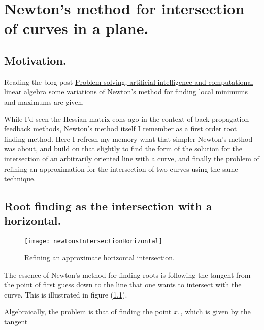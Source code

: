 %
%

\chapter{Newton's method for intersection of curves in a plane.}
\label{chap:intersectionNewton}
{}
\date{Mar 7, 2010}

\beginArtNoToc

\section{Motivation.}

Reading the blog post \href{http://www.cafelinear.com/2010/02/problem-solving-artificial-intelligence-and-linear-algebra/}{Problem solving, artificial intelligence and computational linear algebra} some variations of Newton's method for finding local minimums and maximums are given.

While I'd seen the Hessian matrix eons ago in the context of back propagation feedback methods, Newton's method itself I remember as a first order root finding method.  Here I refresh my memory what that simpler Newton's method was about, and build on that slightly to find the form of the solution for the intersection of an arbitrarily oriented line with a curve, and finally the problem of refining an approximation for the intersection of two curves using the same technique.

\section{Root finding as the intersection with a horizontal.}

\begin{figure}[htp]
\centering
\texttt{[image: newtonsIntersectionHorizontal]}
\caption{Refining an approximate horizontal intersection.}\label{fig:newtonsIntersectionHorizontal}
\end{figure}

The essence of Newton's method for finding roots is following the tangent from the point of first guess down to the line that one wants to intersect with the curve.  This is illustrated in figure (\ref{fig:newtonsIntersectionHorizontal}).

Algebraically, the problem is that of finding the point $x_1$, which is given by the tangent

